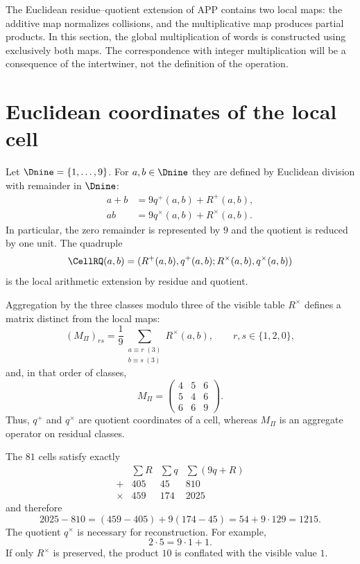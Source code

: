 \label{int:chap:producto-nativo}

The Euclidean residue--quotient extension of APP contains two local maps: the additive map normalizes collisions, and the multiplicative map produces partial products. In this section, the global multiplication of words is constructed using exclusively both maps. The correspondence with integer multiplication will be a consequence of the intertwiner, not the definition of the operation.

\section{Euclidean coordinates of the local cell}

\begin{definition}
Let $\Dnine=\{1,\ldots,9\}$. For $a,b\in\Dnine$ they are defined by Euclidean division
with remainder in $\Dnine$:
\begin{align}
 a+b&=9q^+(a,b)+R^+(a,b),\label{int:eq:local-plus}\\
 ab&=9q^\times(a,b)+R^\times(a,b).\label{int:eq:local-times}
\end{align}
In particular, the zero remainder is represented by $9$ and the quotient is reduced by
one unit. The quadruple
\[
 \CellRQ(a,b)=
 (R^+(a,b),q^+(a,b);R^\times(a,b),q^\times(a,b))
\]
is the local arithmetic extension by residue and quotient.
\end{definition}

Aggregation by the three classes modulo three of the visible table
\(R^\times\) defines a matrix distinct from the local maps:
\[
(M_\Pi)_{rs}
=\frac19
\sum_{\substack{a\equiv r\;(3)\\b\equiv s\;(3)}}R^\times(a,b),
\qquad r,s\in\{1,2,0\},
\]
and, in that order of classes,
\[
M_\Pi=
\begin{pmatrix}4&5&6\\5&4&6\\6&6&9\end{pmatrix}.
\]
Thus, \(q^+\) and \(q^\times\) are quotient coordinates of a cell,
whereas \(M_\Pi\) is an aggregate operator on residual classes.

The $81$ cells satisfy exactly
\[
\begin{array}{c|rrrr}
 &\sum R&\sum q&\sum(9q+R)\\\hline
 +&405&45&810\\
 \times&459&174&2025
\end{array}
\]
and therefore
\[
 2025-810=(459-405)+9(174-45)=54+9\cdot129=1215.
\]
The quotient $q^\times$ is necessary for reconstruction. For example,
\[
 2\cdot5=9\cdot1+1.
\]
If only $R^\times$ is preserved, the product $10$ is conflated with the
visible value $1$.

